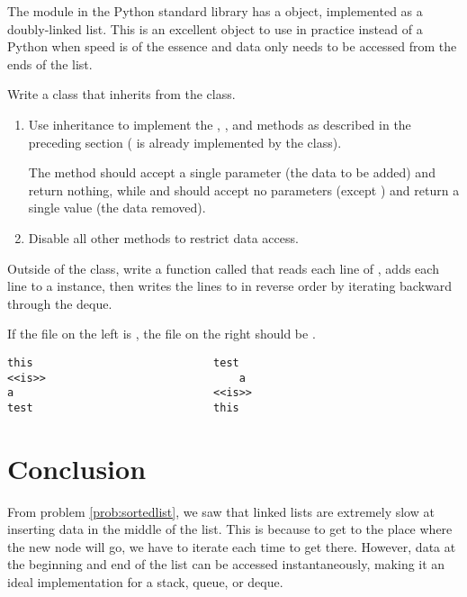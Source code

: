 The  module in the Python standard library has a  object, implemented as a doubly-linked list.
This is an excellent object to use in practice instead of a Python  when speed is of the essence and data only needs to be accessed from the ends of the list.

\begin{problem}
Write a  class that inherits from the  class.
\begin{enumerate}
\item Use inheritance to implement the , , and  methods as described in the preceding section ( is already implemented by the  class).

The  method should accept a single parameter (the data to be added) and return nothing, while  and  should accept no parameters (except ) and return a single value (the data removed).

\item Disable all other methods to restrict data access.
\end{enumerate}

Outside of the class, write a function called  that reads each line of , adds each line to a  instance, then writes the lines to  in reverse order by iterating backward through the deque.

If the file on the left is , the file on the right should be .
\begin{lstlisting}
this                            test
<<is>>                              a
a                               <<is>>
test                            this
\end{lstlisting}
\end{problem}

\section*{Conclusion}

From problem \ref{prob:sortedlist}, we saw that linked lists are extremely slow at inserting data in the middle of the list.
This is because to get to the place where the new node will go, we have to iterate each time to get there.
However, data at the beginning and end of the list can be accessed instantaneously, making it an ideal implementation for a stack, queue, or deque.

